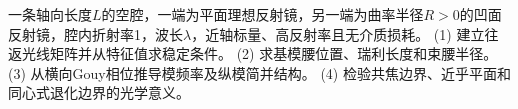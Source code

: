 一条轴向长度\(L\)的空腔，一端为平面理想反射镜，另一端为曲率半径\(R>0\)的凹面反射镜，腔内折射率1，波长\(\lambda\)，近轴标量、高反射率且无介质损耗。
(1) 建立往返光线矩阵并从特征值求稳定条件。
(2) 求基模腰位置、瑞利长度和束腰半径。
(3) 从横向Gouy相位推导模频率及纵模简并结构。
(4) 检验共焦边界、近乎平面和同心式退化边界的光学意义。
